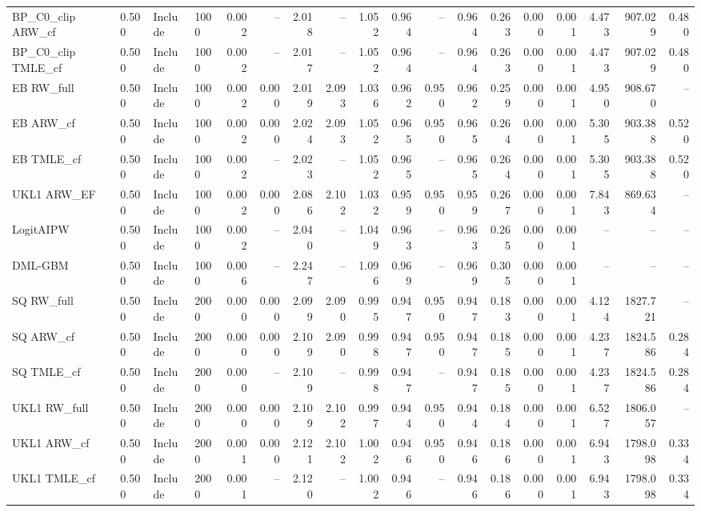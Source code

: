 \begin{tabular}{llllrrrrrrrrrrrrrr}
BP\_C0\_clip ARW\_cf & 0.500 & Include & 1000 & 0.002 & -- & 2.018 & -- & 1.052 & 0.964 & -- & 0.964 & 0.263 & 0.000 & 0.001 & 4.473 & 907.029 & 0.480 \\
BP\_C0\_clip TMLE\_cf & 0.500 & Include & 1000 & 0.002 & -- & 2.017 & -- & 1.052 & 0.964 & -- & 0.964 & 0.263 & 0.000 & 0.001 & 4.473 & 907.029 & 0.480 \\
EB RW\_full & 0.500 & Include & 1000 & 0.002 & 0.000 & 2.019 & 2.093 & 1.036 & 0.962 & 0.950 & 0.962 & 0.259 & 0.000 & 0.001 & 4.950 & 908.670 & -- \\
EB ARW\_cf & 0.500 & Include & 1000 & 0.002 & 0.000 & 2.024 & 2.093 & 1.052 & 0.965 & 0.950 & 0.965 & 0.264 & 0.000 & 0.001 & 5.305 & 903.388 & 0.520 \\
EB TMLE\_cf & 0.500 & Include & 1000 & 0.002 & -- & 2.023 & -- & 1.052 & 0.965 & -- & 0.965 & 0.264 & 0.000 & 0.001 & 5.305 & 903.388 & 0.520 \\
UKL1 ARW\_EF & 0.500 & Include & 1000 & 0.002 & 0.000 & 2.086 & 2.102 & 1.032 & 0.959 & 0.950 & 0.959 & 0.267 & 0.000 & 0.001 & 7.843 & 869.634 & -- \\
LogitAIPW & 0.500 & Include & 1000 & 0.002 & -- & 2.040 & -- & 1.049 & 0.963 & -- & 0.963 & 0.265 & 0.000 & 0.001 & -- & -- & -- \\
DML-GBM & 0.500 & Include & 1000 & 0.006 & -- & 2.247 & -- & 1.096 & 0.969 & -- & 0.969 & 0.305 & 0.000 & 0.001 & -- & -- & -- \\
SQ RW\_full & 0.500 & Include & 2000 & 0.000 & 0.000 & 2.099 & 2.090 & 0.995 & 0.947 & 0.950 & 0.947 & 0.183 & 0.000 & 0.001 & 4.124 & 1827.721 & -- \\
SQ ARW\_cf & 0.500 & Include & 2000 & 0.000 & 0.000 & 2.109 & 2.090 & 0.998 & 0.947 & 0.950 & 0.947 & 0.185 & 0.000 & 0.001 & 4.237 & 1824.586 & 0.284 \\
SQ TMLE\_cf & 0.500 & Include & 2000 & 0.000 & -- & 2.109 & -- & 0.998 & 0.947 & -- & 0.947 & 0.185 & 0.000 & 0.001 & 4.237 & 1824.586 & 0.284 \\
UKL1 RW\_full & 0.500 & Include & 2000 & 0.000 & 0.000 & 2.109 & 2.102 & 0.997 & 0.944 & 0.950 & 0.944 & 0.184 & 0.000 & 0.001 & 6.527 & 1806.057 & -- \\
UKL1 ARW\_cf & 0.500 & Include & 2000 & 0.001 & 0.000 & 2.121 & 2.102 & 1.002 & 0.946 & 0.950 & 0.946 & 0.186 & 0.000 & 0.001 & 6.943 & 1798.098 & 0.334 \\
UKL1 TMLE\_cf & 0.500 & Include & 2000 & 0.001 & -- & 2.120 & -- & 1.002 & 0.946 & -- & 0.946 & 0.186 & 0.000 & 0.001 & 6.943 & 1798.098 & 0.334 \\

\end{tabular}
